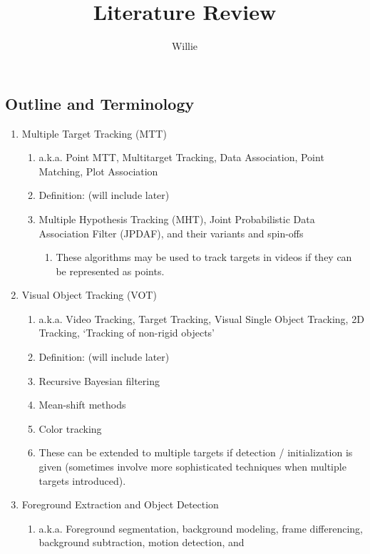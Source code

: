 \documentclass{article}
\begin{document}
\title{Literature Review}
\author{Willie}
\maketitle
\mbox{}





\subsection*{Outline and Terminology}
\vspace{6pt}
\begin{enumerate}
\item Multiple Target Tracking (MTT)
	\begin{enumerate}
	\item a.k.a. Point MTT, Multitarget Tracking, Data Association, Point Matching, Plot Association
	\item Definition: (will include later)
	\item Multiple Hypothesis Tracking (MHT), Joint Probabilistic Data Association Filter (JPDAF), and their variants and spin-offs
		\begin{enumerate}
		\item These algorithms may be used to track targets in videos if they can be represented as points.
		\end{enumerate}
	\end{enumerate}
\item Visual Object Tracking (VOT)
	\begin{enumerate}
	\item a.k.a. Video Tracking, Target Tracking, Visual Single Object Tracking, 2D Tracking, `Tracking of non-rigid objects'
	\item Definition: (will include later)
	\item Recursive Bayesian filtering
	\item Mean-shift methods
	\item Color tracking %
	\item These can be extended to multiple targets if detection / initialization is given (sometimes involve more sophisticated techniques when multiple targets introduced).
	\end{enumerate}
\item Foreground Extraction and Object Detection
	\begin{enumerate}
	\item a.k.a. Foreground segmentation, background modeling, frame differencing, background subtraction, motion detection, and \\

\end{enumerate}
\end{enumerate}
\end{document}
